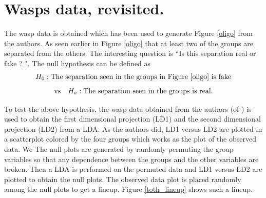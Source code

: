 \documentclass[12]{article}
\begin{document}

\section{Wasps data, revisited. }


The wasp data is obtained which has been used to generate Figure \ref{oligo} from the authors.  As seen earlier in Figure \ref{oligo} that at least two of the groups are separated from the others.  The interesting question is ``Is this separation real or fake ? ". The null hypothesis can be defined as $$H_0: \hbox{The separation seen in the groups in Figure \ref{oligo} is fake}$$
$$ \hbox{vs} \quad H_a: \hbox{The separation seen in the groups is real.}$$ 


To test the above hypothesis, the wasp data obtained from the authors (of \cite{toth:2010}) is used to obtain the first dimensional projection (LD1) and the second dimensional projection (LD2) from a LDA. As the authors did, LD1 versus LD2 are plotted in a scatterplot colored by the four groups which works as the plot of the observed data. We The null plots are generated by randomly permuting the group variables so that any dependence between the groups and the other variables are broken. Then a LDA is performed on the permuted data and LD1 versus LD2 are plotted to obtain the null plots. The observed data plot is placed randomly among the null plots to get a lineup. Figure \ref{toth_lineup} shows such a lineup.
\end{document}
